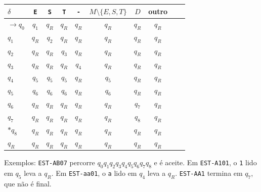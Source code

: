 \documentclass[10pt,a4paper]{article}
\newcommand{\tk}[1]{\texttt{#1}}
\begin{document}
\begin{center}\small
\begin{tabular}{@{}l*{8}{c}c@{}}
\toprule
$\delta$ & \tk{E} & \tk{S} & \tk{T} & \tk{-} & $M\setminus\{E,S,T\}$ & $D$ & outro\\
\midrule
$\to q_0$ & $q_1$ & $q_R$ & $q_R$ & $q_R$ & $q_R$ & $q_R$ & $q_R$\\
$q_1$ & $q_R$ & $q_2$ & $q_R$ & $q_R$ & $q_R$ & $q_R$ & $q_R$\\
$q_2$ & $q_R$ & $q_R$ & $q_3$ & $q_R$ & $q_R$ & $q_R$ & $q_R$\\
$q_3$ & $q_R$ & $q_R$ & $q_R$ & $q_4$ & $q_R$ & $q_R$ & $q_R$\\
$q_4$ & $q_5$ & $q_5$ & $q_5$ & $q_R$ & $q_5$ & $q_R$ & $q_R$\\
$q_5$ & $q_6$ & $q_6$ & $q_6$ & $q_R$ & $q_6$ & $q_R$ & $q_R$\\
$q_6$ & $q_R$ & $q_R$ & $q_R$ & $q_R$ & $q_R$ & $q_7$ & $q_R$\\
$q_7$ & $q_R$ & $q_R$ & $q_R$ & $q_R$ & $q_R$ & $q_8$ & $q_R$\\
$*q_8$ & $q_R$ & $q_R$ & $q_R$ & $q_R$ & $q_R$ & $q_R$ & $q_R$\\
$q_R$ & $q_R$ & $q_R$ & $q_R$ & $q_R$ & $q_R$ & $q_R$ & $q_R$\\
\bottomrule
\end{tabular}
\end{center}
Exemplos: \tk{EST-AB07} percorre $q_0 q_1 q_2 q_3 q_4 q_5 q_6 q_7 q_8$ e é aceite. Em \tk{EST-A101}, o \tk{1}
lido em $q_5$ leva a $q_R$. Em \tk{EST-aa01}, o \tk{a} lido em $q_4$ leva a $q_R$. \tk{EST-AA1} termina em $q_7$, que não é final.
\end{document}
